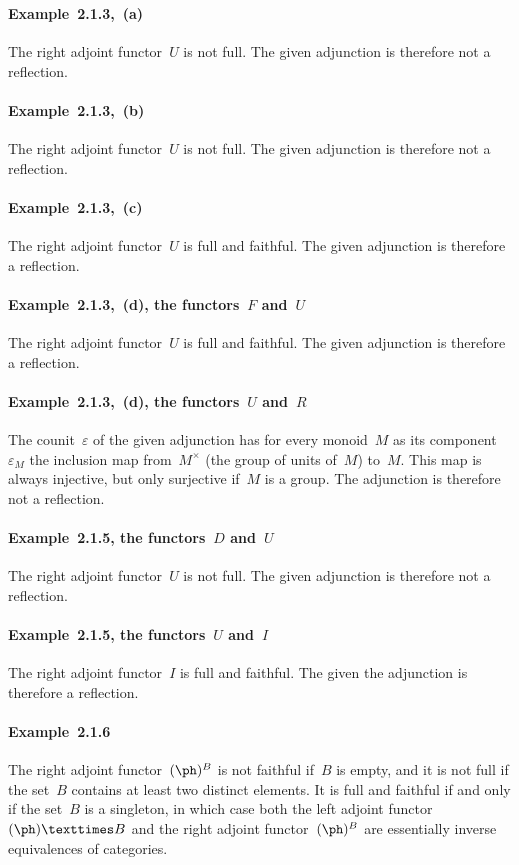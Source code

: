 \subsubsection{}

\paragraph{Example~2.1.3,~(a)}
The right adjoint functor~$U$ is not full.
The given adjunction is therefore not a reflection.

\paragraph{Example~2.1.3,~(b)}
The right adjoint functor~$U$ is not full.
The given adjunction is therefore not a reflection.

\paragraph{Example~2.1.3,~(c)}
The right adjoint functor~$U$ is full and faithful.
The given adjunction is therefore a reflection.

\paragraph{Example~2.1.3,~(d), the functors~$F$ and~$U$}
The right adjoint functor~$U$ is full and faithful.
The given adjunction is therefore a reflection.

\paragraph{Example~2.1.3,~(d), the functors~$U$ and~$R$}
The counit~$ε$ of the given adjunction has for every monoid~$M$ as its component~$ε_M$ the inclusion map from~$M^×$ (the group of units of~$M$) to~$M$.
This map is always injective, but only surjective if~$M$ is a group.
The adjunction is therefore not a reflection.

\paragraph{Example~2.1.5, the functors~$D$ and~$U$}
The right adjoint functor~$U$ is not full.
The given adjunction is therefore not a reflection.

\paragraph{Example~2.1.5, the functors~$U$ and~$I$}
The right adjoint functor~$I$ is full and faithful.
The given the adjunction is therefore a reflection.

\paragraph{Example~2.1.6}
The right adjoint functor~$(\ph)^B$ is not faithful if~$B$ is empty, and it is not full if the set~$B$ contains at least two distinct elements.
It is full and faithful if and only if the set~$B$ is a singleton, in which case both the left adjoint functor~$(\ph) × B$ and the right adjoint functor~$(\ph)^B$ are essentially inverse equivalences of categories.
